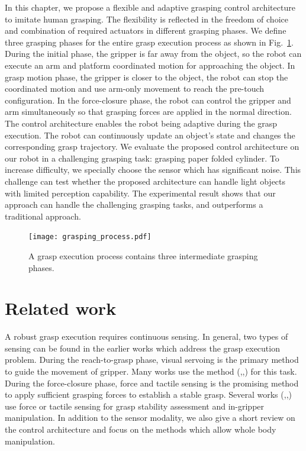 In this chapter, we propose a flexible and adaptive grasping control architecture to imitate  human grasping. The flexibility is reflected in the freedom of choice and combination of  required actuators in different grasping phases. We define three grasping phases for the entire grasp execution process as shown in Fig.~\ref{fig:grasping_process}. During the initial phase, the gripper is far away from the object, so the robot can execute an arm and platform coordinated motion for approaching the object. In grasp motion phase, the gripper is closer to the object, the robot can stop the coordinated motion and use arm-only movement to reach the pre-touch configuration. In the force-closure phase, the robot can control the gripper and arm simultaneously so that grasping forces are applied in the 	normal direction. The control architecture enables the robot being adaptive during the grasp execution. The robot can continuously update an object's state and changes the corresponding grasp trajectory.  We evaluate the proposed control architecture on our robot in a challenging grasping task: grasping paper folded cylinder. To increase difficulty, we specially choose the sensor which has significant noise. This challenge can test whether the proposed architecture can handle light objects with limited perception capability. The experimental result shows that our approach can handle the challenging grasping tasks, and outperforms a traditional approach.  
\begin{figure}[!htbp]
\centering
\texttt{[image: grasping\_process.pdf]}
\captionsetup{justification=raggedright}
\caption{A grasp execution process contains three intermediate grasping phases.}
\label{fig:grasping_process}       
\end{figure} 

\section{Related work}
A robust grasp execution requires continuous sensing. In general, two types of sensing can be found in the earlier works which address the grasp execution problem. During the reach-to-grasp phase, visual servoing is the primary method to guide the movement of gripper. Many works use the method (\cite{Kragic2002},\cite{Gridseth2015},\cite{Fujimoto2000}) for this task. During the force-closure phase, force and tactile sensing is the promising method to apply sufficient grasping forces to establish a stable grasp. Several works (\cite{Maekawa1996},\cite{Dang2012tactile},\cite{Dang2013}) use force or tactile sensing for grasp stability assessment and in-gripper manipulation. In addition to the sensor modality, we also give a short review on the control architecture and focus on the methods which allow whole body manipulation. 
 

